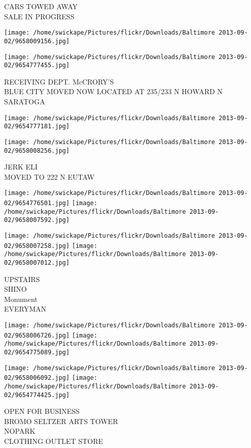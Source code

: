 \documentclass[10pt,letterpaper]{article}
\begin{document}
CARS TOWED AWAY\\
SALE IN PROGRESS\\
\pagebreak

\texttt{[image: /home/swickape/Pictures/flickr/Downloads/Baltimore 2013-09-02/9658009156.jpg]}

\vspace{0.25in}
\texttt{[image: /home/swickape/Pictures/flickr/Downloads/Baltimore 2013-09-02/9654777455.jpg]}

RECEIVING DEPT. McCRORY'S\\
BLUE CITY MOVED NOW LOCATED AT 235/233 N HOWARD N SARATOGA\\
\pagebreak

\texttt{[image: /home/swickape/Pictures/flickr/Downloads/Baltimore 2013-09-02/9654777181.jpg]}

\vspace{0.25in}
\texttt{[image: /home/swickape/Pictures/flickr/Downloads/Baltimore 2013-09-02/9658008256.jpg]}

JERK ELI\\
MOVED TO 222 N EUTAW\\
\pagebreak

\texttt{[image: /home/swickape/Pictures/flickr/Downloads/Baltimore 2013-09-02/9654776501.jpg]}
\texttt{[image: /home/swickape/Pictures/flickr/Downloads/Baltimore 2013-09-02/9658007592.jpg]}

\texttt{[image: /home/swickape/Pictures/flickr/Downloads/Baltimore 2013-09-02/9658007258.jpg]}
\texttt{[image: /home/swickape/Pictures/flickr/Downloads/Baltimore 2013-09-02/9658007012.jpg]}

UPSTAIRS\\
SHINO\\
Monument\\
EVERYMAN\\
\pagebreak

\texttt{[image: /home/swickape/Pictures/flickr/Downloads/Baltimore 2013-09-02/9658006726.jpg]}
\texttt{[image: /home/swickape/Pictures/flickr/Downloads/Baltimore 2013-09-02/9654775089.jpg]}

\texttt{[image: /home/swickape/Pictures/flickr/Downloads/Baltimore 2013-09-02/9658006092.jpg]}
\texttt{[image: /home/swickape/Pictures/flickr/Downloads/Baltimore 2013-09-02/9654774425.jpg]}

OPEN FOR BUSINESS\\
BROMO SELTZER ARTS TOWER\\
NOPARK\\
CLOTHING OUTLET STORE\\
\pagebreak
\end{document}
